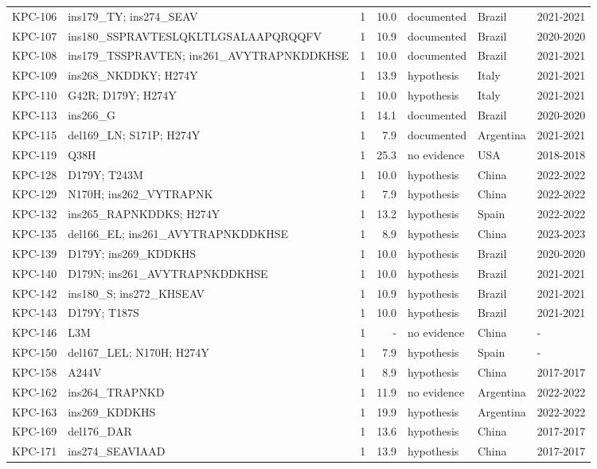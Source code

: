 \begin{longtable}{@{}l p{4.6cm} r r l l l@{}}
KPC-106 & ins179\_TY; ins274\_SEAV & 1 & 10.0 & documented & Brazil & 2021-2021 \\
KPC-107 & ins180\_SSPRAVTESLQKLTLGSALAAPQRQQFV & 1 & 10.9 & documented & Brazil & 2020-2020 \\
KPC-108 & ins179\_TSSPRAVTEN; ins261\_AVYTRAPNKDDKHSE & 1 & 10.0 & documented & Brazil & 2021-2021 \\
KPC-109 & ins268\_NKDDKY; H274Y & 1 & 13.9 & hypothesis & Italy & 2021-2021 \\
KPC-110 & G42R; D179Y; H274Y & 1 & 10.0 & hypothesis & Italy & 2021-2021 \\
KPC-113 & ins266\_G & 1 & 14.1 & documented & Brazil & 2020-2020 \\
KPC-115 & del169\_LN; S171P; H274Y & 1 & 7.9 & documented & Argentina & 2021-2021 \\
KPC-119 & Q38H & 1 & 25.3 & no evidence & USA & 2018-2018 \\
KPC-128 & D179Y; T243M & 1 & 10.0 & hypothesis & China & 2022-2022 \\
KPC-129 & N170H; ins262\_VYTRAPNK & 1 & 7.9 & hypothesis & China & 2022-2022 \\
KPC-132 & ins265\_RAPNKDDKS; H274Y & 1 & 13.2 & hypothesis & Spain & 2022-2022 \\
KPC-135 & del166\_EL; ins261\_AVYTRAPNKDDKHSE & 1 & 8.9 & hypothesis & China & 2023-2023 \\
KPC-139 & D179Y; ins269\_KDDKHS & 1 & 10.0 & hypothesis & Brazil & 2020-2020 \\
KPC-140 & D179N; ins261\_AVYTRAPNKDDKHSE & 1 & 10.0 & hypothesis & Brazil & 2021-2021 \\
KPC-142 & ins180\_S; ins272\_KHSEAV & 1 & 10.9 & hypothesis & Brazil & 2021-2021 \\
KPC-143 & D179Y; T187S & 1 & 10.0 & hypothesis & Brazil & 2021-2021 \\
KPC-146 & L3M & 1 & - & no evidence & China & - \\
KPC-150 & del167\_LEL; N170H; H274Y & 1 & 7.9 & hypothesis & Spain & - \\
KPC-158 & A244V & 1 & 8.9 & hypothesis & China & 2017-2017 \\
KPC-162 & ins264\_TRAPNKD & 1 & 11.9 & no evidence & Argentina & 2022-2022 \\
KPC-163 & ins269\_KDDKHS & 1 & 19.9 & hypothesis & Argentina & 2022-2022 \\
KPC-169 & del176\_DAR & 1 & 13.6 & hypothesis & China & 2017-2017 \\
KPC-171 & ins274\_SEAVIAAD & 1 & 13.9 & hypothesis & China & 2017-2017 \\

\end{longtable}

